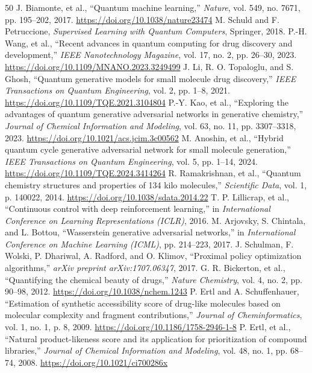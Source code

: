 \documentclass[10pt,a4paper]{article}
\begin{document}
\begin{thebibliography}{50}
 J. Biamonte, et al., ``Quantum machine learning,'' \textit{Nature}, vol. 549, no. 7671, pp. 195--202, 2017. \url{https://doi.org/10.1038/nature23474}
 M. Schuld and F. Petruccione, \textit{Supervised Learning with Quantum Computers}, Springer, 2018.
 P.-H. Wang, et al., ``Recent advances in quantum computing for drug discovery and development,'' \textit{IEEE Nanotechnology Magazine}, vol. 17, no. 2, pp. 26--30, 2023. \url{https://doi.org/10.1109/MNANO.2023.3249499}
 J. Li, R. O. Topaloglu, and S. Ghosh, ``Quantum generative models for small molecule drug discovery,'' \textit{IEEE Transactions on Quantum Engineering}, vol. 2, pp. 1--8, 2021. \url{https://doi.org/10.1109/TQE.2021.3104804}
 P.-Y. Kao, et al., ``Exploring the advantages of quantum generative adversarial networks in generative chemistry,'' \textit{Journal of Chemical Information and Modeling}, vol. 63, no. 11, pp. 3307--3318, 2023. \url{https://doi.org/10.1021/acs.jcim.3c00562}
 M. Anoshin, et al., ``Hybrid quantum cycle generative adversarial network for small molecule generation,'' \textit{IEEE Transactions on Quantum Engineering}, vol. 5, pp. 1--14, 2024. \url{https://doi.org/10.1109/TQE.2024.3414264}
 R. Ramakrishnan, et al., ``Quantum chemistry structures and properties of 134 kilo molecules,'' \textit{Scientific Data}, vol. 1, p. 140022, 2014. \url{https://doi.org/10.1038/sdata.2014.22}
 T. P. Lillicrap, et al., ``Continuous control with deep reinforcement learning,'' in \textit{International Conference on Learning Representations (ICLR)}, 2016.
 M. Arjovsky, S. Chintala, and L. Bottou, ``Wasserstein generative adversarial networks,'' in \textit{International Conference on Machine Learning (ICML)}, pp. 214--223, 2017.
 J. Schulman, F. Wolski, P. Dhariwal, A. Radford, and O. Klimov, ``Proximal policy optimization algorithms,'' \textit{arXiv preprint arXiv:1707.06347}, 2017.
 G. R. Bickerton, et al., ``Quantifying the chemical beauty of drugs,'' \textit{Nature Chemistry}, vol. 4, no. 2, pp. 90--98, 2012. \url{https://doi.org/10.1038/nchem.1243}
 P. Ertl and A. Schuffenhauer, ``Estimation of synthetic accessibility score of drug-like molecules based on molecular complexity and fragment contributions,'' \textit{Journal of Cheminformatics}, vol. 1, no. 1, p. 8, 2009. \url{https://doi.org/10.1186/1758-2946-1-8}
 P. Ertl, et al., ``Natural product-likeness score and its application for prioritization of compound libraries,'' \textit{Journal of Chemical Information and Modeling}, vol. 48, no. 1, pp. 68--74, 2008. \url{https://doi.org/10.1021/ci700286x}

\end{thebibliography}
\end{document}
